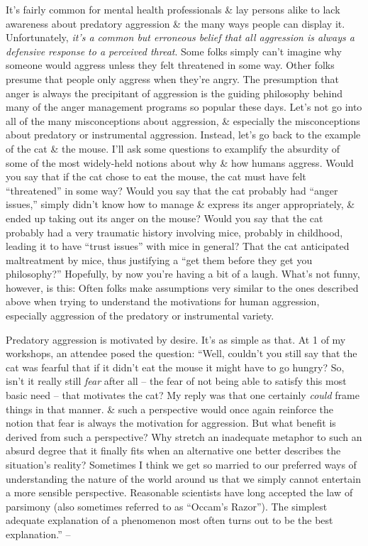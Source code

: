 \documentclass{article}
\numberwithin{equation}{section}
\begin{document}
It's fairly common for mental health professionals \& lay persons alike to lack awareness about predatory aggression \& the many ways people can display it. Unfortunately, \textit{it's a common but erroneous belief that all aggression is always a defensive response to a perceived threat}. Some folks simply can't imagine why someone would aggress unless they felt threatened in some way. Other folks presume that people only aggress when they're angry. The presumption that anger is always the precipitant of aggression is the guiding philosophy behind many of the anger management programs so popular these days. Let's not go into all of the many misconceptions about aggression, \& especially the misconceptions about predatory or instrumental aggression. Instead, let's go back to the example of the cat \& the mouse. I'll ask some questions to examplify the absurdity of some of the most widely-held notions about why \& how humans aggress. Would you say that if the cat chose to eat the mouse, the cat must have felt ``threatened'' in some way? Would you say that the cat probably had ``anger issues,'' simply didn't know how to manage \& express its anger appropriately, \& ended up taking out its anger on the mouse? Would you say that the cat probably had a very traumatic history involving mice, probably in childhood, leading it to have ``trust issues'' with mice in general? That the cat anticipated maltreatment by mice, thus justifying a ``get them before they get you philosophy?'' Hopefully, by now you're having a bit of a laugh. What's not funny, however, is this: Often folks make assumptions very similar to the ones described above when trying to understand the motivations for human aggression, especially aggression of the predatory or instrumental variety.

Predatory aggression is motivated by desire. It's as simple as that. At 1 of my workshops, an attendee posed the question: ``Well, couldn't you still say that the cat was fearful that if it didn't eat the mouse it might have to go hungry? So, isn't it really still \textit{fear} after all -- the fear of not being able to satisfy this most basic need -- that motivates the cat? My reply was that one certainly \textit{could} frame things in that manner. \& such a perspective would once again reinforce the notion that fear is always the motivation for aggression. But what benefit is derived from such a perspective? Why stretch an inadequate metaphor to such an absurd degree that it finally fits when an alternative one better describes the situation's reality? Sometimes I think we get so married to our preferred ways of understanding the nature of the world around us that we simply cannot entertain a more sensible perspective. Reasonable scientists have long accepted the law of parsimony (also sometimes referred to as ``Occam's Razor''). The simplest adequate explanation of a phenomenon most often turns out to be the best explanation.'' -- \cite[pp. 89--91]{Simon2011}
\end{document}
